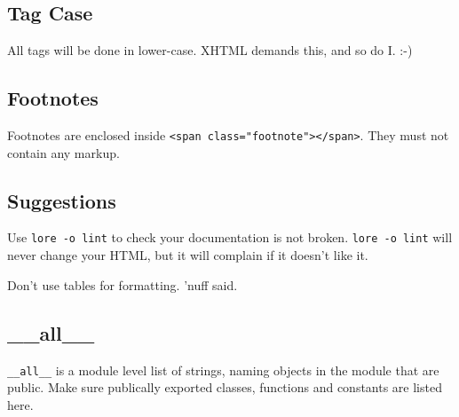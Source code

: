 \subsection{Tag Case}


All tags will be done in lower-case. XHTML demands this, and     so do I. :-)

\subsection{Footnotes}


Footnotes are enclosed inside      \texttt{<span class="footnote"></span>}. They must not     contain any markup.

\subsection{Suggestions}


Use \texttt{lore -o lint} to check your documentation     is not broken. \texttt{lore -o lint} will never change     your HTML, but it will complain if it doesn't like it.

Don't use tables for formatting. 'nuff said.

\subsection{\_\_all\_\_}


\texttt{\_\_all\_\_} is a module level list of strings, naming     objects in the module that are public. Make sure publically exported classes,     functions and constants are listed here.